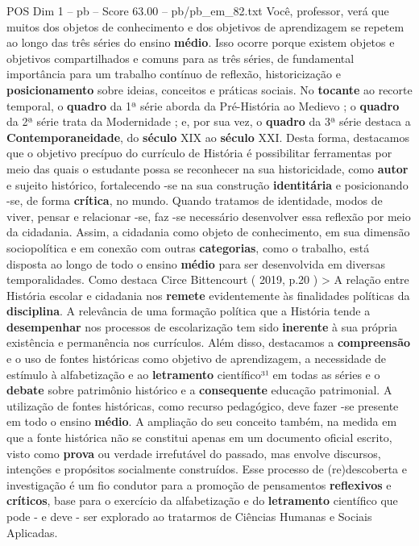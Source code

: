 \begin{textsample}{POS Dim 1 – pb – Score 63.00 – pb/pb\_em\_82.txt}
Você, professor, verá que muitos dos objetos de conhecimento e dos objetivos de aprendizagem se repetem ao longo das três séries do ensino \textbf{médio}.
Isso ocorre porque existem objetos e objetivos compartilhados e comuns para as três séries, de fundamental importância para um trabalho contínuo de reflexão, historicização e \textbf{posicionamento} sobre ideias, conceitos e práticas sociais.
No \textbf{tocante} ao recorte temporal, o \textbf{quadro} da 1ª série aborda da Pré-História ao Medievo ; o \textbf{quadro} da 2ª série trata da Modernidade ; e, por sua vez, o \textbf{quadro} da 3ª série destaca a \textbf{Contemporaneidade}, do \textbf{século} XIX ao \textbf{século} XXI.
Desta forma, destacamos que o objetivo precípuo do currículo de História é possibilitar ferramentas por meio das quais o estudante possa se reconhecer na sua historicidade, como \textbf{autor} e sujeito histórico, fortalecendo -se na sua construção \textbf{identitária} e posicionando -se, de forma \textbf{crítica}, no mundo.
Quando tratamos de identidade, modos de viver, pensar e relacionar -se, faz -se necessário desenvolver essa reflexão por meio da cidadania.
Assim, a cidadania como objeto de conhecimento, em sua dimensão sociopolítica e em conexão com outras \textbf{categorias}, como o trabalho, está disposta ao longo de todo o ensino \textbf{médio} para ser desenvolvida em diversas temporalidades.
Como destaca Circe Bittencourt ( 2019, p.20 ) > A relação entre História escolar e cidadania nos \textbf{remete} evidentemente às finalidades políticas da \textbf{disciplina}.
A relevância de uma formação política que a História tende a \textbf{desempenhar} nos processos de escolarização tem sido \textbf{inerente} à sua própria existência e permanência nos currículos.
Além disso, destacamos a \textbf{compreensão} e o uso de fontes históricas como objetivo de aprendizagem, a necessidade de estímulo à alfabetização e ao \textbf{letramento} científico³¹ em todas as séries e o \textbf{debate} sobre patrimônio histórico e a \textbf{consequente} educação patrimonial.
A utilização de fontes históricas, como recurso pedagógico, deve fazer -se presente em todo o ensino \textbf{médio}.
A ampliação do seu conceito também, na medida em que a fonte histórica não se constitui apenas em um documento oficial escrito, visto como \textbf{prova} ou verdade irrefutável do passado, mas envolve discursos, intenções e propósitos socialmente construídos.
Esse processo de (re)descoberta e investigação é um fio condutor para a promoção de pensamentos \textbf{reflexivos} e \textbf{críticos}, base para o exercício da alfabetização e do \textbf{letramento} científico que pode - e deve - ser explorado ao tratarmos de Ciências Humanas e Sociais Aplicadas.

\end{textsample}
